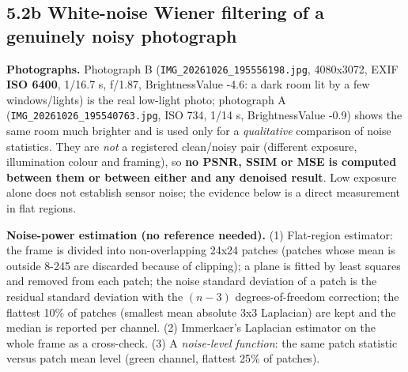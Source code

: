 \documentclass[10pt,a4paper]{article}
\begin{document}
\subsection{5.2b White-noise Wiener filtering of a genuinely noisy photograph}
\textbf{Photographs.} Photograph B (\texttt{IMG\_\allowbreak{}20261026\_\allowbreak{}195556198.\allowbreak{}jpg}, 4080x3072, EXIF \textbf{ISO 6400}, 1/16.7 s, f/1.87, BrightnessValue -4.6: a dark room lit by a few windows/lights) is the real low-light photo; photograph A (\texttt{IMG\_\allowbreak{}20261026\_\allowbreak{}195540763.\allowbreak{}jpg}, ISO 734, 1/14 s, BrightnessValue -0.9) shows the same room much brighter and is used only for a \textit{qualitative} comparison of noise statistics. They are \textit{not} a registered clean/noisy pair (different exposure, illumination colour and framing), so \textbf{no PSNR, SSIM or MSE is computed between them or between either and any denoised result}. Low exposure alone does not establish sensor noise; the evidence below is a direct measurement in flat regions.

\textbf{Noise-power estimation (no reference needed).} (1) Flat-region estimator: the frame is divided into non-overlapping 24x24 patches (patches whose mean is outside 8-245 are discarded because of clipping); a plane is fitted by least squares and removed from each patch; the noise standard deviation of a patch is the residual standard deviation with the $(n-3)$ degrees-of-freedom correction; the flattest 10\% of patches (smallest mean absolute 3x3 Laplacian) are kept and the median is reported per channel. (2) Immerkaer's Laplacian estimator on the whole frame as a cross-check. (3) A \textit{noise-level function}: the same patch statistic versus patch mean level (green channel, flattest 25\% of patches).
\end{document}
